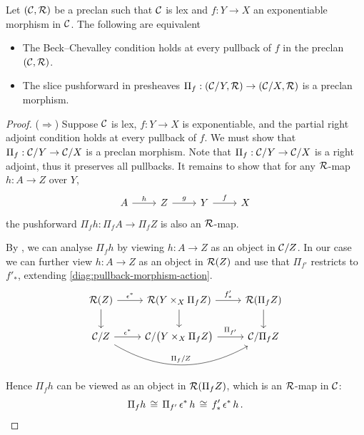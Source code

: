 \begin{proposition}\label{prop:lex-exponentiable}
  Let $(\mathcal{C},\mathcal{R})$ be a preclan such that
  $\mathcal{C}$ is lex and $f : Y \to X$
  an exponentiable morphism in $\mathcal{C}$.
  The following are equivalent
  \begin{itemize}
  \item
    The Beck--Chevalley condition holds at every pullback of
    $f$ in the preclan $(\mathcal{C},\mathcal{R})$.
  \item
    The slice pushforward in presheaves $\Pi_f : (\mathcal{C}/Y, \mathcal{R}) \to (\mathcal{C}/X, \mathcal{R})$
    is a preclan morphism.
  \end{itemize}
\end{proposition}
\begin{proof}

  ($\Rightarrow$)
  Suppose $\mathcal{C}$ is lex, $f : Y \to X$ is exponentiable, and
  the partial right adjoint condition holds at every pullback of $f$.
  We must show that $\Pi_f : \mathcal{C} / Y \to \mathcal{C} / X$ is a preclan morphism.
  Note that $\Pi_f : \mathcal{C} / Y \to \mathcal{C} / X$ is a right adjoint,
  thus it preserves all pullbacks.
  It remains to show that for any $\mathcal{R}$-map $h : A \to Z$ over $Y$,
  \[\begin{tikzcd}
    A & Z & Y & X
    \arrow["h", from=1-1, to=1-2]
    \arrow["g", from=1-2, to=1-3]
    \arrow["f", from=1-3, to=1-4]
  \end{tikzcd}\]
  the pushforward $\Pi_f h : \Pi_f A \to \Pi_f Z$
  is also an $\mathcal{R}$-map.

  By ,
  we can analyse $\Pi_f h$ by viewing $h : A \to Z$ as an object in $\mathcal{C} / Z$.
  In our case we can further view $h : A \to Z$ as an object in $\mathcal{R}(Z)$
  and use that $\Pi_{f'}$ restricts to $f'_*$,
  extending \cref{diag:pullback-morphism-action}.
  \[\begin{tikzcd}
    {\RR(Z)} & {\RR(Y \times_X \Pi_f Z)} & {\RR(\Pi_f Z)} \\
    {\CC / Z} & {\CC / \big( Y \times_X \Pi_f Z \big)} & {\CC / \Pi_f Z}
    \arrow["{\epsilon^*}", from=1-1, to=1-2]
    \arrow[from=1-1, to=2-1]
    \arrow["{f'_*}", from=1-2, to=1-3]
    \arrow[from=1-2, to=2-2]
    \arrow[from=1-3, to=2-3]
    \arrow["{\epsilon^*}", from=2-1, to=2-2]
    \arrow["{\Pi_{f'}}", from=2-2, to=2-3]
    \arrow["{\Pi_f/Z}", from=2-1, to=2-3, bend right]
  \end{tikzcd}\]
  Hence $\Pi_f h$ can be viewed as an object in $\mathcal{R}(\Pi_f Z)$,
  which is an $\mathcal{R}$-map in $\mathcal{C}$:
  \[
    \Pi_f h
    \,\cong\, \Pi_{f'} \, \epsilon^* \, h
    \,\cong\, f'_* \, \epsilon^* \, h \,.
  \]


\end{proof}
